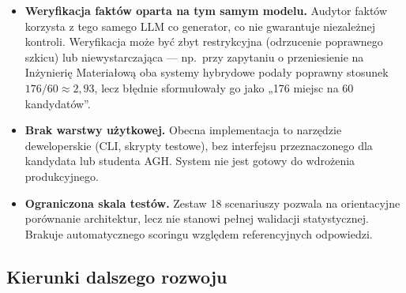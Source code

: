 \begin{tcolorbox}[colback=red!5!white,colframe=red!50!black,title=Ograniczenia obecnej implementacji]
\begin{itemize}[leftmargin=*, nosep]
        \item \textbf{Weryfikacja faktów oparta na tym samym modelu.}
              Audytor faktów korzysta z tego samego LLM co generator, co nie gwarantuje niezależnej kontroli.
              Weryfikacja może być zbyt restrykcyjna (odrzucenie poprawnego szkicu) lub niewystarczająca ---
              np.\ przy zapytaniu o przeniesienie na Inżynierię Materiałową oba systemy hybrydowe podały
              poprawny stosunek $176/60 \approx 2{,}93$, lecz błędnie sformułowały go jako „176 miejsc na 60 kandydatów''.

        \item \textbf{Brak warstwy użytkowej.}
              Obecna implementacja to narzędzie deweloperskie (CLI, skrypty testowe), bez interfejsu
              przeznaczonego dla kandydata lub studenta AGH. System nie jest gotowy do wdrożenia produkcyjnego.

        \item \textbf{Ograniczona skala testów.}
              Zestaw 18 scenariuszy pozwala na orientacyjne porównanie architektur, lecz nie stanowi
              pełnej walidacji statystycznej. Brakuje automatycznego scoringu względem referencyjnych odpowiedzi.
    \end{itemize}
\end{tcolorbox}

\vspace{1em}

\subsection*{Kierunki dalszego rozwoju}

